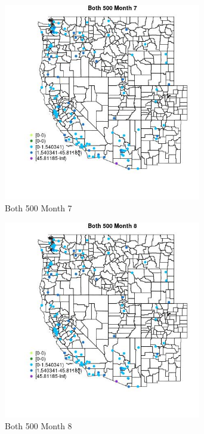 \begin{figure} 
\centering  
\includegraphics[width=0.77\textwidth]{Code_Outputs/Report_ML_input_PM25_Step4_part_e_de_duplicated_aves_MapObsMo7Both_500.jpg} 
\caption{\label{fig:Report_ML_input_PM25_Step4_part_e_de_duplicated_avesMapObsMo7Both_500}Both 500 Month 7} 
\end{figure} 
 

\begin{figure} 
\centering  
\includegraphics[width=0.77\textwidth]{Code_Outputs/Report_ML_input_PM25_Step4_part_e_de_duplicated_aves_MapObsMo8Both_500.jpg} 
\caption{\label{fig:Report_ML_input_PM25_Step4_part_e_de_duplicated_avesMapObsMo8Both_500}Both 500 Month 8} 
\end{figure} 
 

